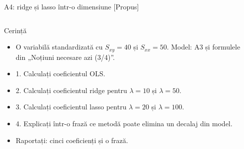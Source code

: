 \begin{frame}{A4: ridge și lasso într-o dimensiune [Propus]}
\propsub
\itemsize{\scriptsize}
\begin{columns}[T]
\begin{column}{\taskw}
\begin{block}{Cerință}
\begin{itemize}
    \item O variabilă standardizată cu $S_{xy} = 40$ și $S_{xx} = 50$. Model: A3 și formulele din „Noțiuni necesare azi (3/4)”.
    \item 1. Calculați coeficientul OLS.
    \item 2. Calculați coeficientul ridge pentru $\lambda = 10$ și $\lambda = 50$.
    \item 3. Calculați coeficientul lasso pentru $\lambda = 20$ și $\lambda = 100$.
    \item 4. Explicați într-o frază ce metodă poate elimina un decalaj din model.
    \item Raportați: cinci coeficienți și o frază.
\end{itemize}
\end{block}
\end{column}
\begin{column}{\solw}
\end{column}
\end{columns}
\end{frame}

